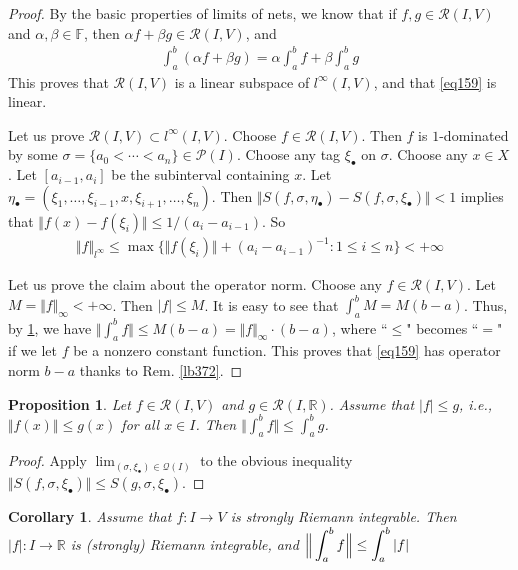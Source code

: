 \documentclass[12pt,b5paper,notitlepage]{article}
\theoremstyle{definition}
\theoremstyle{plain}
\newtheorem{pp}[df]{Proposition}
\newtheorem{co}[df]{Corollary}
\newcommand{\mc}{\mathcal}
\newcommand{\scr}{\mathscr}
\newcommand{\blt}{\bullet}
\newcommand{\Rbb}{\mathbb R}
\newcommand{\Fbb}{\mathbb F}
\newcommand{\dps}{\displaystyle}
\numberwithin{equation}{section}
\begin{document}
\begin{proof}
By the basic properties of limits of nets, we know that if $f,g\in\scr R(I,V)$ and $\alpha,\beta\in\Fbb$, then $\alpha f+\beta g\in\scr R(I,V)$, and
\begin{align}
\int_a^b (\alpha f+\beta g)=\alpha\int_a^b f+\beta\int_a^b g
\end{align}
This proves that $\scr R(I,V)$ is a linear subspace of $l^\infty(I,V)$, and that \eqref{eq159} is linear. 

Let us prove $\scr R(I,V)\subset l^\infty(I,V)$. Choose $f\in\scr R(I,V)$. Then $f$ is $1$-dominated by some $\sigma=\{a_0<\cdots<a_n\}\in\mc P(I)$. Choose any tag $\xi_\blt$ on $\sigma$. Choose any $x\in X$. Let $[a_{i-1},a_i]$ be the subinterval containing $x$. Let $\eta_\blt=(\xi_1,\dots,\xi_{i-1},x,\xi_{i+1},\dots,\xi_n)$. Then $\Vert S(f,\sigma,\eta_\blt)-S(f,\sigma,\xi_\blt)\Vert<1$ implies that $\Vert f(x)-f(\xi_i)\Vert\leq 1/(a_i-a_{i-1})$. So
\begin{align*}
\Vert f\Vert_{l^\infty}\leq \max\big\{\Vert f(\xi_i)\Vert+(a_i-a_{i-1})^{-1}:1\leq i\leq n  \big\}<+\infty
\end{align*}

Let us prove the claim about the operator norm. Choose any $f\in\scr R(I,V)$. Let $M=\Vert f\Vert_\infty<+\infty$. Then $|f|\leq M$. It is easy to see that $\int_a^b M=M(b-a)$. Thus, by \ref{lb379}, we have $\Vert\int_a^b f\Vert\leq M(b-a)=\Vert f\Vert_\infty\cdot(b-a)$, where ``$\leq$" becomes ``$=$" if we let $f$ be a nonzero constant function. This proves that \eqref{eq159} has operator norm $b-a$ thanks to Rem. \ref{lb372}.
\end{proof}



\begin{pp}\label{lb379}
Let $f\in\scr R(I,V)$ and $g\in\scr R(I,\Rbb)$. Assume that $|f|\leq g$, i.e., $\Vert f(x)\Vert\leq g(x)$ for all $x\in I$. Then $\dps \Big\Vert \int_a^b f \Big\Vert\leq\int_a^b g$.
\end{pp}


\begin{proof}
Apply $\lim_{(\sigma,\xi_\blt)\in\mc Q(I)}$ to the obvious inequality $\Vert S(f,\sigma,\xi_\blt) \Vert\leq S(g,\sigma,\xi_\blt)$.
\end{proof}


\begin{co}
Assume that $f:I\rightarrow V$ is strongly Riemann integrable. Then $|f|:I\rightarrow\Rbb$ is (strongly) Riemann integrable, and $\dps\dps \Big\Vert \int_a^b f \Big\Vert\leq\int_a^b |f|$
\end{co}
\end{document}
